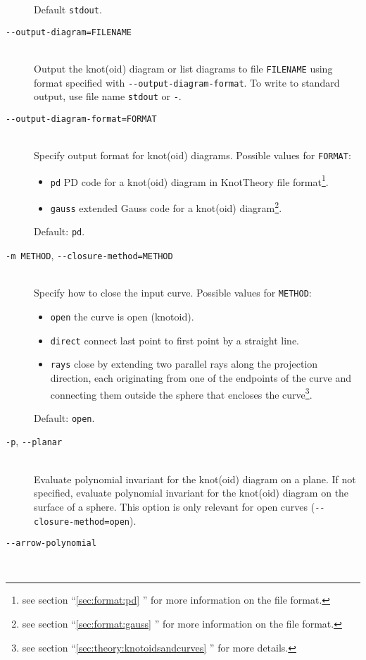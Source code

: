 \begin{description}
  Default \lstinline{stdout}.
\item[\lstinline{--output-diagram=FILENAME}]\hfill\\
  Output the knot(oid) diagram or list diagrams to  file \lstinline{FILENAME} using format specified with \lstinline{--output-diagram-format}. To write to standard output, use file name \lstinline{stdout} or \lstinline{-}.
\item[\lstinline{--output-diagram-format=FORMAT}]\hfill\\
  Specify output format for knot(oid) diagrams. Possible values for \lstinline{FORMAT}:
  \begin{itemize}
    \item \lstinline{pd} PD code for a knot(oid) diagram in KnotTheory file format\footnote{see section ``\ref{sec:format:pd} ''  for more information on the file format.}.  
    \item \lstinline{gauss} extended Gauss code for a knot(oid) diagram\footnote{see section ``\ref{sec:format:gauss} ''  for more information on the file format.}.
  \end{itemize}
  Default: \lstinline{pd}.
\item[\lstinline{-m METHOD}, \lstinline{--closure-method=METHOD}]\hfill\\
  Specify how to close the input curve. Possible values for \lstinline{METHOD}:
  \begin{itemize}
  \item \lstinline{open} the curve is open (knotoid).
  \item \lstinline{direct} connect last point to first point by a straight line.
  \item \lstinline{rays} close by extending two parallel rays along the projection direction, each originating from one of the endpoints of the curve and connecting them outside the sphere that encloses the curve\footnote{see section ``\ref{sec:theory:knotoidsandcurves} '' for more details.}.
  \end{itemize}
  Default: \lstinline{open}.
\item[\lstinline{-p}, \lstinline{--planar}]\hfill\\
  Evaluate polynomial invariant for the knot(oid) diagram on a plane. If not specified, evaluate polynomial invariant for the knot(oid) diagram on the surface of a sphere. This option is only relevant for open curves (\lstinline{--closure-method=open}).
\item[\lstinline{--arrow-polynomial}]\hfill\\

\end{description}
